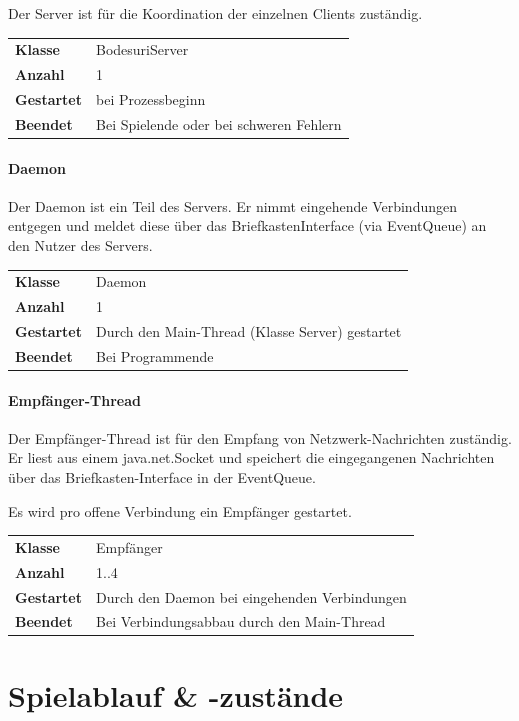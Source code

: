 \documentclass[12pt,halfparskip]{scrartcl}
\begin{document}
Der Server ist für die Koordination der einzelnen Clients zuständig.

\begin{tabular}{@{} l p{12.5cm}}
\textbf{Klasse}       & BodesuriServer \\
\textbf{Anzahl}       & 1 \\
\textbf{Gestartet}    & bei Prozessbeginn \\
\textbf{Beendet}      & Bei Spielende oder bei schweren Fehlern
\end{tabular}

\paragraph{Daemon}
\label{ssub:daemon}

Der Daemon ist ein Teil des Servers. Er nimmt eingehende Verbindungen entgegen und meldet diese über das BriefkastenInterface (via EventQueue) an den Nutzer des Servers.

\begin{tabular}{@{} l p{12.5cm}}
\textbf{Klasse}       & Daemon \\
\textbf{Anzahl}       & 1 \\
\textbf{Gestartet}    & Durch den Main-Thread (Klasse Server) gestartet \\
\textbf{Beendet}      & Bei Programmende
\end{tabular}

\paragraph{Empfänger-Thread}

Der Empfänger-Thread ist für den Empfang von Netzwerk-Nachrichten zuständig. Er liest aus einem java.net.Socket und speichert die eingegangenen Nachrichten über das Briefkasten-Interface in der EventQueue.

Es wird pro offene Verbindung ein Empfänger gestartet.

\begin{tabular}{@{} l p{12.5cm}}
\textbf{Klasse}       & Empfänger \\
\textbf{Anzahl}       & 1..4 \\
\textbf{Gestartet}    & Durch den Daemon bei eingehenden Verbindungen  \\
\textbf{Beendet}      & Bei Verbindungsabbau durch den Main-Thread
\end{tabular}

\clearpage
\section{Spielablauf \& -zustände}
\end{document}
